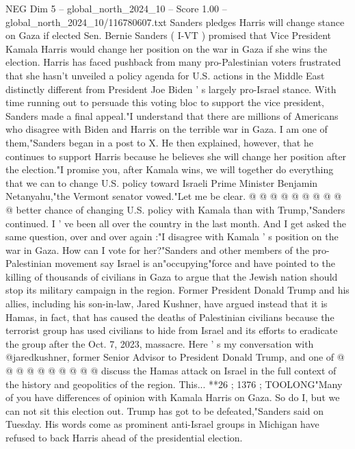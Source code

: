 \begin{textsample}{NEG Dim 5 – global\_north\_2024\_10 – Score 1.00 – global\_north\_2024\_10/116780607.txt}  \label{ex:f5_neg_045}
Sanders pledges Harris will change stance on Gaza if elected Sen.
Bernie Sanders ( I-VT ) promised that Vice President Kamala Harris would change her position on the war in Gaza if she wins the election.
Harris has faced pushback from many pro-Palestinian voters frustrated that she hasn't unveiled a policy agenda for U.S. actions in the Middle East distinctly different from President Joe Biden ' s largely pro-Israel stance.
With time running out to persuade this voting bloc to support the vice president, Sanders made a final appeal."I understand that there are millions of Americans who disagree with Biden and Harris on the terrible war in Gaza.
I am one of them,"Sanders began in a post to X.
He then explained, however, that he continues to support Harris because he believes she will change her position after the election."I promise you, after Kamala wins, we will together do everything that we can to change U.S. policy toward Israeli Prime Minister Benjamin Netanyahu,"the Vermont senator vowed."Let me be clear. @ @ @ @ @ @ @ @ @ @ better chance of changing U.S. policy with Kamala than with Trump,"Sanders continued.
I ' ve been all over the country in the last month.
And I get asked the same question, over and over again :"I disagree with Kamala ' s position on the war in Gaza.
How can I vote for her?"Sanders and other members of the pro-Palestinian movement say Israel is an"occupying"force and have pointed to the killing of thousands of civilians in Gaza to argue that the Jewish nation should stop its military campaign in the region.
Former President Donald Trump and his allies, including his son-in-law, Jared Kushner, have argued instead that it is Hamas, in fact, that has caused the deaths of Palestinian civilians because the terrorist group has used civilians to hide from Israel and its efforts to eradicate the group after the Oct. 7, 2023, massacre.
Here ' s my conversation with @jaredkushner, former Senior Advisor to President Donald Trump, and one of @ @ @ @ @ @ @ @ @ @ discuss the Hamas attack on Israel in the full context of the history and geopolitics of the region.
This... **26 ; 1376 ; TOOLONG"Many of you have differences of opinion with Kamala Harris on Gaza.
So do I, but we can not sit this election out.
Trump has got to be defeated,"Sanders said on Tuesday.
His words come as prominent anti-Israel groups in Michigan have refused to back Harris ahead of the presidential election.

\end{textsample}
